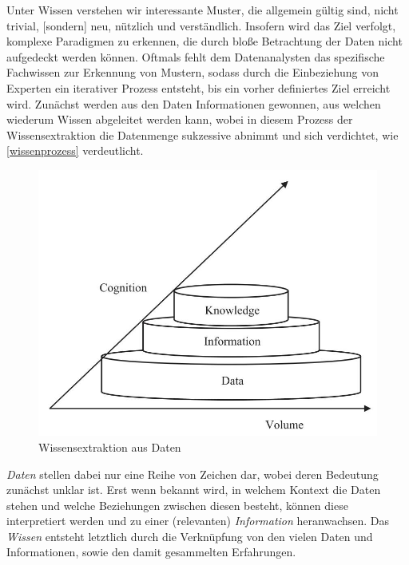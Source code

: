 \glqq Unter Wissen verstehen wir interessante Muster, die allgemein gültig sind, nicht trivial, [sondern] neu, nützlich und verständlich.\grqq{} Insofern wird das Ziel verfolgt, komplexe Paradigmen zu erkennen, die durch bloße Betrachtung der Daten nicht aufgedeckt werden können. Oftmals fehlt dem Datenanalysten das spezifische Fachwissen zur Erkennung von Mustern, sodass durch die Einbeziehung von Experten ein iterativer Prozess entsteht, bis ein vorher definiertes Ziel erreicht wird. Zunächst werden aus den Daten Informationen gewonnen, aus welchen wiederum Wissen abgeleitet werden kann, wobei in diesem Prozess der Wissensextraktion die Datenmenge sukzessive abnimmt und sich verdichtet, wie \vref{wissenprozess} verdeutlicht.

\begin{figure}[H]
\centering
\includegraphics[scale=1.3]{se-wa-jpg/wissenprozess}
\caption[Wissensextraktion aus Daten]{Wissensextraktion aus Daten\protect\footnotemark}
\label{wissenprozess}
\end{figure}

\textit{Daten} stellen dabei nur eine Reihe von Zeichen dar, wobei deren Bedeutung zunächst unklar ist. Erst wenn bekannt wird, in welchem Kontext die Daten stehen und welche Beziehungen zwischen diesen besteht, können diese interpretiert werden und zu einer (relevanten) \textit{Information} heranwachsen. Das \textit{Wissen} entsteht letztlich durch die Verknüpfung von den vielen Daten und Informationen, sowie den damit gesammelten Erfahrungen.

